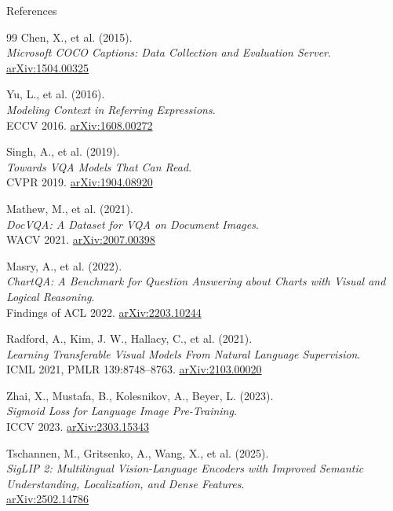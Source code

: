 \begin{frame}[allowframebreaks]{References}
\begin{thebibliography}{99}
      Chen, X., et al. (2015). \\
      \emph{Microsoft COCO Captions: Data Collection and Evaluation Server}.\\
      \href{https://arxiv.org/abs/1504.00325}{arXiv:1504.00325}

      Yu, L., et al. (2016). \\
      \emph{Modeling Context in Referring Expressions}.\\
      ECCV 2016. \href{https://arxiv.org/abs/1608.00272}{arXiv:1608.00272}

      Singh, A., et al. (2019). \\
      \emph{Towards VQA Models That Can Read}.\\
      CVPR 2019. \href{https://arxiv.org/abs/1904.08920}{arXiv:1904.08920}

      Mathew, M., et al. (2021). \\
      \emph{DocVQA: A Dataset for VQA on Document Images}.\\
      WACV 2021. \href{https://arxiv.org/abs/2007.00398}{arXiv:2007.00398}

      Masry, A., et al. (2022). \\
      \emph{ChartQA: A Benchmark for Question Answering about Charts with Visual and Logical Reasoning}.\\
      Findings of ACL 2022. \href{https://arxiv.org/abs/2203.10244}{arXiv:2203.10244}

      Radford, A., Kim, J. W., Hallacy, C., et al. (2021). \\
      \emph{Learning Transferable Visual Models From Natural Language Supervision}.\\
      ICML 2021, PMLR 139:8748--8763. \href{https://arxiv.org/abs/2103.00020}{arXiv:2103.00020}

      Zhai, X., Mustafa, B., Kolesnikov, A., Beyer, L. (2023). \\
      \emph{Sigmoid Loss for Language Image Pre-Training}.\\
      ICCV 2023. \href{https://arxiv.org/abs/2303.15343}{arXiv:2303.15343}

      Tschannen, M., Gritsenko, A., Wang, X., et al. (2025). \\
      \emph{SigLIP 2: Multilingual Vision-Language Encoders with Improved Semantic Understanding, Localization, and Dense Features}.\\
      \href{https://arxiv.org/abs/2502.14786}{arXiv:2502.14786}


\end{thebibliography}
\end{frame}
